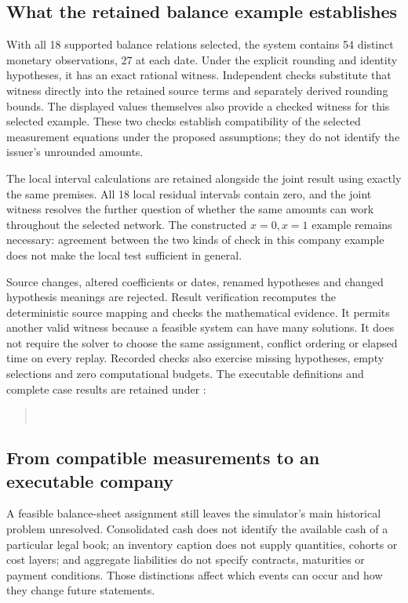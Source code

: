 \subsection{What the retained balance example establishes}

With all 18 supported balance relations selected, the system contains
54 distinct monetary observations, 27 at each date. Under the explicit
rounding and identity hypotheses, it has an exact rational witness.
Independent checks substitute that witness directly into the retained source
terms and separately derived rounding bounds. The displayed values themselves
also provide a checked witness for this selected example. These two checks
establish compatibility of the selected measurement equations under the
proposed assumptions; they do not identify the issuer's unrounded amounts.

The local interval calculations are retained alongside the joint result
using exactly the same premises. All 18 local residual intervals contain
zero, and the joint witness resolves the further question of whether the
same amounts can work throughout the selected network. The constructed
\(x=0, x=1\) example remains necessary: agreement between the two kinds
of check in this company example does not make the local test sufficient
in general.

Source changes, altered coefficients or dates, renamed hypotheses and
changed hypothesis meanings are rejected. Result verification recomputes
the deterministic source mapping and checks the mathematical evidence.
It permits another valid witness because a feasible system can have many
solutions. It does not require the solver to choose the same assignment,
conflict ordering or elapsed time on every replay. Recorded checks also
exercise missing hypotheses, empty selections and zero computational budgets.
The executable definitions and complete case results are retained under
:
\begin{quote}\small
{}\\
\end{quote}

\subsection{From compatible measurements to an executable company}

A feasible balance-sheet assignment still leaves the simulator's main
historical problem unresolved. Consolidated cash does not identify the
available cash of a particular legal book; an inventory caption does not
supply quantities, cohorts or cost layers; and aggregate liabilities do
not specify contracts, maturities or payment conditions. Those distinctions
affect which events can occur and how they change future statements.

